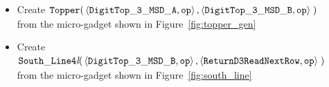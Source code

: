 \begin{itemize}
\begin{itemize}
            \item Create
            $\begin{aligned}[t]
                {\tt Topper}(& \left\langle {\tt DigitTop\_3\_MSD\_A}, {\tt op} \right\rangle,
                               \left\langle {\tt DigitTop\_3\_MSD\_B}, {\tt op} \right\rangle \;)
            \end{aligned}$ from the micro-gadget shown in Figure~\ref{fig:topper_gen}


            \item Create
            $\begin{aligned}[t]
                {\tt South\_Line4\textit{l}}(& \left\langle {\tt DigitTop\_3\_MSD\_B}, {\tt op} \right\rangle,
                                               \left\langle {\tt ReturnD3ReadNextRow},      {\tt op} \right\rangle \;)
            \end{aligned}$ \\ from the micro-gadget shown in Figure~\ref{fig:south_line}
        \end{itemize}

    \end{itemize}


